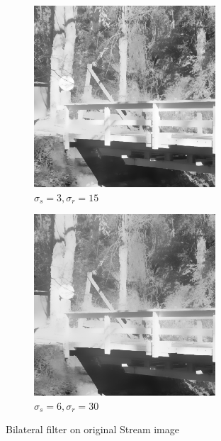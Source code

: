 \documentclass[a4paper, landscape]{article}
\begin{document}
\begin{figure}
    \centering
    \begin{subfigure}{0.48\linewidth}
        \centering
        \includegraphics[width=\linewidth]{stream,σ_spatial3,σ_range15.png}
        \caption{$\sigma_s=3, \sigma_r=15$}
    \end{subfigure}
    \begin{subfigure}{0.48\linewidth}
        \centering
        \includegraphics[width=\linewidth]{stream,σ_spatial6,σ_range30.png}
        \caption{$\sigma_s=6, \sigma_r=30$}
    \end{subfigure}
    \caption{Bilateral filter on original Stream image}
    \label{fig:ks}
\end{figure}
\end{document}
